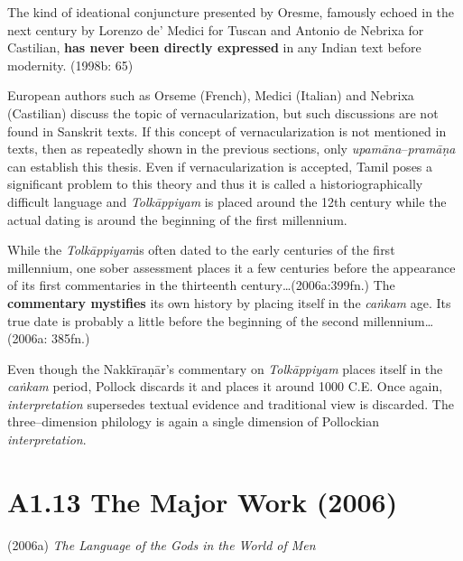 \begin{myquote}
The kind of ideational conjuncture presented by Oresme, famously echoed in the next century by Lorenzo de’ Medici for Tuscan and Antonio de Nebrixa for Castilian, \textbf{has never been directly expressed} in any Indian text before modernity. (1998b: 65)
\end{myquote}

European authors such as Orseme (French), Medici (Italian) and Nebrixa (Castilian) discuss the topic of vernacularization, but such discussions are not found in Sanskrit texts. If this concept of vernacularization is not mentioned in texts, then as repeatedly shown in the previous sections, only \textit{upamāna}–\textit{pramāṇa} can establish this thesis. Even if vernacularization is accepted, Tamil poses a significant problem to this theory and thus it is called a historiographically difficult language and \textit{Tolkāppiyam} is placed around the 12th century while the actual dating is around the beginning of the first millennium.

\begin{myquote}
While the \textit{Tolkāppiyam}is often dated to the early centuries of the first millennium, one sober assessment places it a few centuries before the appearance of its first commentaries in the thirteenth century…(2006a:399fn.) The \textbf{commentary mystifies} its own history by placing itself in the \textit{caṅkam} age. Its true date is probably a little before the beginning of the second millennium…(2006a: 385fn.)
\end{myquote}

Even though the Nakkīraṇār’s commentary on \textit{Tolkāppiyam }places itself in the \textit{caṅkam} period, Pollock discards it and places it around 1000 C.E. Once again, \textit{interpretation} supersedes textual evidence and traditional view is discarded. The three–dimension philology is again a single dimension of Pollockian \textit{interpretation}.

\newpage

\section*{A1.13 The Major Work (2006)}

(2006a)\textit{ The Language of the Gods in the World of Men}

